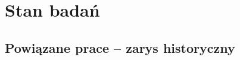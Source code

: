 %
%
%
%
%
%
%
%
%




\chapter{Stan badań}
\label{cha:stan.badan}

\section{Powiązane prace – zarys historyczny}
\label{sec:zarys.historyczny}

